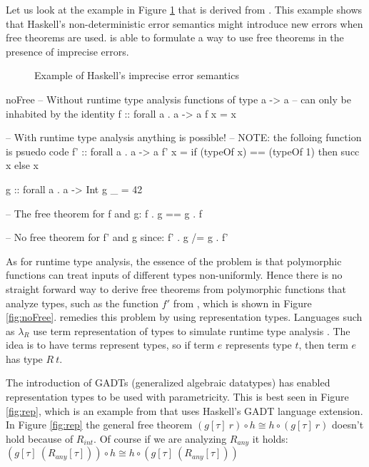 Let us look at the example in Figure \ref{fig:imprecise} that is derived from \cite{impreciseSemantics}. This example shows that Haskell's non-deterministic error semantics might introduce new errors when free theorems are used. \cite{impreciseSemantics} is able to formulate a way to use free theorems in the presence of imprecise errors.

\begin{figure}
  \caption{Example of Haskell's imprecise error semantics}
  \label{fig:imprecise}
\end{figure}


\begin{SaveVerbatim}{noFree}
-- Without runtime type analysis functions of type a -> a
-- can only be inhabited by the identity
f :: forall a . a -> a
f x = x

-- With runtime type analysis anything is possible!
-- NOTE: the folloing function is psuedo code
f' :: forall a . a -> a
f' x = if (typeOf x) == (typeOf 1)
         then succ x
         else x

g :: forall a . a -> Int
g _ = 42

-- The free theorem for f and g:
f . g == g . f

-- No free theorem for f' and g since:
f' . g /= g . f'
\end{SaveVerbatim}


As for runtime type analysis, the essence of the problem is that polymorphic functions can treat inputs of different types non-uniformly. Hence there is no straight forward way to derive free theorems from polymorphic functions that analyze types, such as the function $f'$ from \cite{vytinFree}, which is shown in Figure \ref{fig:noFree}. \cite{vytinFree} remedies this problem by using representation types. Languages such as $\lambda_R $ use term representation of types to simulate runtime type analysis \cite{erasureSemantics}. The idea is to have terms represent types, so if term $e$ represents type $t$, then term $e$ has type $R\ t$. 

The introduction of GADTs (generalized algebraic datatypes) has enabled representation types to be used with parametricity. This is best seen in Figure \ref{fig:rep}, which is an example from \cite{vytinFree} that uses Haskell's GADT language extension. In Figure \ref{fig:rep} the general free theorem $(g[\tau]\ r) \circ h \cong h \circ (g[\tau]\ r) $ doesn't hold because of $R_{int} $. Of course if we are analyzing $R_{any} $ it holds: $(g[\tau]\ (R_{any}[\tau])) \circ h \cong h \circ (g[\tau]\ (R_{any}[\tau])) $ \cite{vytinFree}

